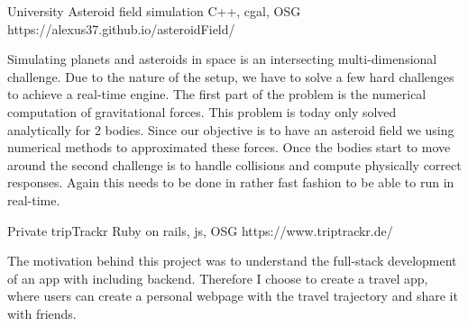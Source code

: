 

\begin{cventries}

  \cventry
    {University}
    {Asteroid field simulation} %
    {C++, cgal, OSG} %
    {https://alexus37.github.io/asteroidField/} %
    {
      \begin{cvitems} %
        \item {Simulating planets and asteroids in space is an intersecting multi-dimensional challenge. Due to the nature of the setup, we have to solve a few hard challenges to achieve a real-time engine. The first part of the problem is the numerical computation of gravitational forces. This problem is today only solved analytically for 2 bodies. Since our objective is to have an asteroid field we using numerical methods to approximated these forces. Once the bodies start to move around the second challenge is to handle collisions and compute physically correct responses. Again this needs to be done in rather fast fashion to be able to run in real-time.}
      \end{cvitems}
    }

  \cventry
    {Private}
    {tripTrackr} %
    {Ruby on rails, js, OSG} %
    {https://www.triptrackr.de/} %
    {
      \begin{cvitems} %
        \item {
The motivation behind this project was to understand the full-stack development of an app with including backend. Therefore I choose to create a travel app, where users can create a personal webpage with the travel trajectory and share it with friends.
        }
      \end{cvitems}
    }


\end{cventries}
